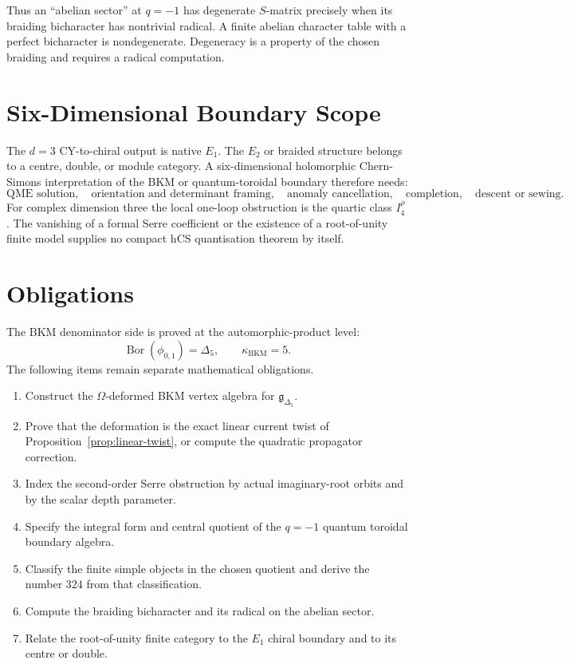\documentclass[11pt]{article}
\providecommand{\kBKM}{\kappa_{\mathrm{BKM}}}
\begin{document}
Thus an ``abelian sector'' at \(q=-1\) has degenerate \(S\)-matrix
precisely when its braiding bicharacter has nontrivial radical.  A
finite abelian character table with a perfect bicharacter is
nondegenerate.  Degeneracy is a property of the chosen braiding and
requires a radical computation.

\section{Six-Dimensional Boundary Scope}
\label{sec:hcs-boundary-scope}

The \(d=3\) CY-to-chiral output is native \(E_1\).  The \(E_2\) or
braided structure belongs to a centre, double, or module category.  A
six-dimensional holomorphic Chern-Simons interpretation of the BKM or
quantum-toroidal boundary therefore needs:
\[
  \text{QME solution},\quad
  \text{orientation and determinant framing},\quad
  \text{anomaly cancellation},\quad
  \text{completion},\quad
  \text{descent or sewing}.
\]
For complex dimension three the local one-loop obstruction is the
quartic class \(I_4^\rho\).  The vanishing of a formal Serre
coefficient or the existence of a root-of-unity finite model supplies no
compact hCS quantisation theorem by itself.

\section{Obligations}
\label{sec:obligations}

The BKM denominator side is proved at the automorphic-product level:
\[
  \operatorname{Bor}(\phi_{0,1})=\Delta_5,\qquad \kBKM=5 .
\]
The following items remain separate mathematical obligations.
\begin{enumerate}[label=\textup{(\arabic*)}]
\item Construct the \(\Omega\)-deformed BKM vertex algebra for
\(\mathfrak g_{\Delta_5}\).
\item Prove that the deformation is the exact linear current twist of
Proposition~\ref{prop:linear-twist}, or compute the quadratic
propagator correction.
\item Index the second-order Serre obstruction by actual imaginary-root
orbits and by the scalar depth parameter.
\item Specify the integral form and central quotient of the
\(q=-1\) quantum toroidal boundary algebra.
\item Classify the finite simple objects in the chosen quotient and
derive the number \(324\) from that classification.
\item Compute the braiding bicharacter and its radical on the abelian
sector.
\item Relate the root-of-unity finite category to the \(E_1\) chiral
boundary and to its centre or double.
\end{enumerate}
\end{document}

